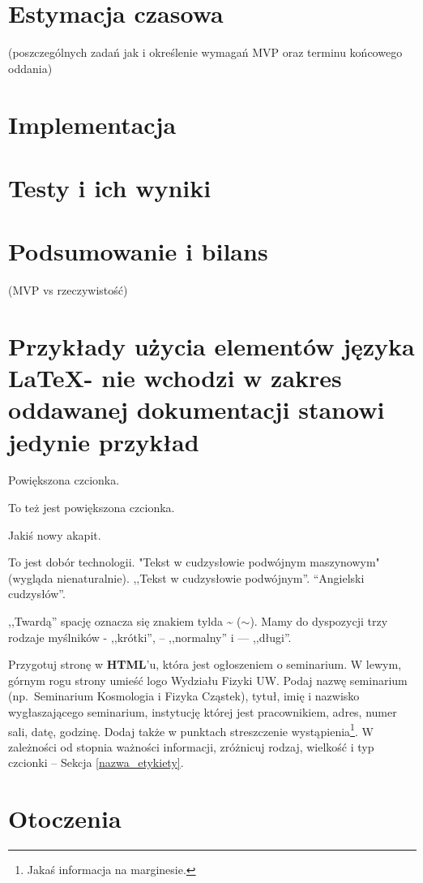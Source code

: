 \documentclass[12pt,a4paper]{article}
\begin{document}
\section{Estymacja czasowa }
(poszczególnych zadań jak i określenie wymagań MVP oraz terminu końcowego oddania)
\section{Implementacja}
\section{Testy i ich wyniki}
\section{Podsumowanie i bilans}
(MVP vs rzeczywistość)
\newpage
\section{Przykłady użycia elementów języka \LaTeX - nie wchodzi w zakres oddawanej dokumentacji stanowi jedynie przykład}
\begin{large}Powiększona czcionka.\end{large}
{\large To też jest powiększona czcionka.}

Jakiś nowy akapit.



To jest dobór technologii.
"Tekst w cudzysłowie podwójnym maszynowym" (wygląda nienaturalnie).
,,Tekst w cudzysłowie podwójnym''. ``Angielski cudzysłów''.

,,Twardą'' spację oznacza się znakiem tylda \~{} ($\sim$).
Mamy do dyspozycji trzy rodzaje myślników - ,,krótki'', -- ,,normalny'' i --- ,,długi''.

\label{nazwa_etykiety}

Przygotuj stronę w \textbf{HTML}'u, która jest ogłoszeniem o seminarium.
W lewym, górnym rogu strony umieść logo Wydziału Fizyki UW.
Podaj nazwę seminarium (np.~Seminarium Kosmologia i Fizyka Cząstek),
tytuł, imię i nazwisko  wygłaszającego seminarium,
instytucję której jest pracownikiem,
adres, numer sali, datę, godzinę.
 Dodaj także w punktach streszczenie wystąpienia\footnote{Jakaś informacja na marginesie.}. 
 W zależności od stopnia ważności informacji, zróżnicuj rodzaj,
wielkość i typ czcionki -- Sekcja \ref{nazwa_etykiety}.

\section{Otoczenia}
\end{document}
